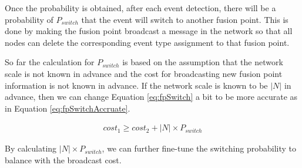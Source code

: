 Once the probability is obtained, after each event detection, there will be a probability of \(P_{switch}\) that the event will switch to another fusion point. This is done by making the fusion point broadcast a message in the network so that all nodes can delete the corresponding event type assignment to that fusion point.

So far the calculation for \(P_{switch}\) is based on the assumption that the network scale is not known in advance and the cost for broadcasting new fusion point information is not known in advance. If the network scale is known to be \(|N|\) in advance, then we can change Equation \ref{eq:fpSwitch} a bit to be more accurate as in Equation \ref{eq:fpSwitchAccruate}.

\begin{align}
cost_1\geq cost_2+|N|\times P_{switch}
\label{eq:fpSwitchAccruate}
\end{align}

By calculating \(|N|\times P_{switch}\), we can further fine-tune the switching probability to balance with the broadcast cost.